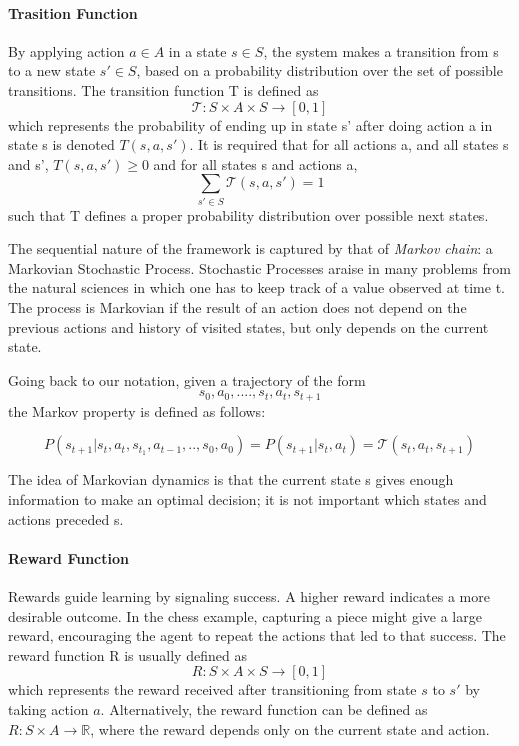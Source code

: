 \documentclass[a4paper,11pt]{report}
\theoremstyle{definition}
\theoremstyle{plain}
\theoremstyle{remark}  %
\begin{document}
\paragraph{Trasition Function}
By applying action $a \in A$ in a state $s \in S$, the system makes a transition from s to a
new state $s' \in S$, based on a probability distribution over the set of possible transitions. 
The transition function T is defined as 
$$\mathcal{T} : S \times A \times S \rightarrow [0,1]$$ which represents the probability
of ending up in state s' after doing action a in state s is denoted $ T(s,a,s')$. It is required that 
for all actions a, and all states s and s', $T (s,a,s') \geq 0$ and for all states s and actions a, 
$$\sum_{s' \in S} \mathcal{T} (s,a,s') = 1$$
such that T defines a proper probability distribution over possible next states. \

The sequential nature of the framework is captured by that of \textit{Markov chain}:
a Markovian Stochastic Process. 
Stochastic Processes araise in many problems from the natural sciences
in which one has to keep track of a value observed at time t. The process is Markovian if the result of an action does not
depend on the previous actions and history of visited states, but only depends on the
current state.

Going back to our notation, given a trajectory of the form 
$$s_0, a_0, . . . . , s_t, a_t, s_{t+1}$$
the Markov property is defined as follows:

$$P(s_{t+1} | s_t ,a_t ,s_{t_1} ,a_{t-1} , . . ,s_0,a_0) = P(s_{t+1} | s_t ,a_t ) = \mathcal{T} (s_t ,a_t ,s_{t+1} )$$

The idea of Markovian dynamics is that the current state s gives enough information
to make an optimal decision; it is not important which states and actions preceded s.

\paragraph{Reward Function}
Rewards guide learning by signaling success. A higher reward indicates a more 
desirable outcome. In the chess example, capturing a piece might give a large reward, encouraging the 
agent to repeat the actions that led to that success. The reward function R is usually defined as
$$R : S \times A \times S \rightarrow [0,1]$$
which represents the reward received after transitioning from state $s$ to $s'$ by taking action $a$.
Alternatively, the reward function can be defined as $R : S \times A \rightarrow \mathbb{R}$, 
where the reward depends only on the current state and action. \\
\end{document}
